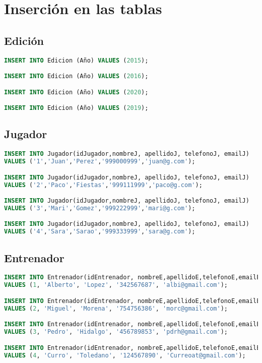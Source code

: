 \section{Inserción en las tablas}
\subsection{Edición}
\begin{lstlisting}[language=sql]
INSERT INTO Edicion (Año) VALUES (2015);

INSERT INTO Edicion (Año) VALUES (2016);

INSERT INTO Edicion (Año) VALUES (2020);

INSERT INTO Edicion (Año) VALUES (2019);
\end{lstlisting}

\subsection{Jugador}
\begin{lstlisting}[language=sql]
INSERT INTO Jugador(idJugador,nombreJ, apellidoJ, telefonoJ, emailJ)
VALUES ('1','Juan','Perez','999000999','juan@g.com');

INSERT INTO Jugador(idJugador,nombreJ, apellidoJ, telefonoJ, emailJ)
VALUES ('2','Paco','Fiestas','999111999','paco@g.com');

INSERT INTO Jugador(idJugador,nombreJ, apellidoJ, telefonoJ, emailJ)
VALUES ('3','Mari','Gomez','999222999','mari@g.com');

INSERT INTO Jugador(idJugador,nombreJ, apellidoJ, telefonoJ, emailJ)
VALUES ('4','Sara','Sarao','999333999','sara@g.com');
\end{lstlisting}

\subsection{Entrenador}
\begin{lstlisting}[language=sql]
INSERT INTO Entrenador(idEntrenador, nombreE,apellidoE,telefonoE,emailE)
VALUES (1, 'Alberto', 'Lopez', '342567687', 'albi@gmail.com');

INSERT INTO Entrenador(idEntrenador, nombreE,apellidoE,telefonoE,emailE)
VALUES (2, 'Miguel', 'Morena', '754756386', 'morc@gmail.com');

INSERT INTO Entrenador(idEntrenador, nombreE,apellidoE,telefonoE,emailE)
VALUES (3, 'Pedro', 'Hidalgo', '456789853', 'pdrh@gmail.com');

INSERT INTO Entrenador(idEntrenador, nombreE,apellidoE,telefonoE,emailE)
VALUES (4, 'Curro', 'Toledano', '124567890', 'Curreoat@gmail.com');
\end{lstlisting}

